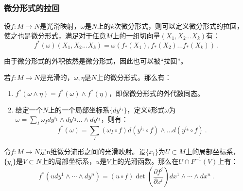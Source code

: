 \subsubsection{微分形式的拉回}
\begin{definition}{}
设$f:M\rightarrow N$是光滑映射，$\omega$是$N$上的$k$次微分形式，则可以定义微分形式的拉回，使之也是微分形式，满足对于任意$M$上的一组切向量$(X_1,X_2...X_k)$有：
\begin{equation}
f^*(\omega)(X_1,X_2...X_k)=\omega(f_*(X_1),f_*(X_2)...f_*(X_k))~.
\end{equation}
\end{definition}
由于微分形式的外积依然是微分形式，因此也可以被“拉回”。
\begin{theorem}{}
若$f:M\rightarrow N$是光滑的，$\omega,\eta$是$N$上的微分形式。那么有：
\begin{enumerate}
\item $f^*(\omega\wedge \eta)=f^*(\omega)\wedge f^*(\eta)$，即保微分形式的外代数同态。
\item 给定一个$N$上的一个局部坐标系$\{dy^{i_1}\}$，定义$k$形式$\omega$为$\omega=\sum_I\omega_I dy^{i_1}\wedge dy^{i_2}...\wedge dy^{i_k}$，则有：
\begin{equation}
f^*(\omega)=\sum_I (\omega_I\circ f)d(y^{i_1}\circ f)\wedge...d(y^{i_k}\circ f)~.
\end{equation}
\end{enumerate}
\end{theorem}
\begin{theorem}{}
令$f:M\rightarrow N$是n维微分流形之间的光滑映射。设$\{x_i\}$为$U\subset M$上的局部坐标系，$\{y_i\}$是$V\subset N$上的局部坐标系，$u$是$V$上的光滑函数。那么在$U\cap F^{-1}(V)$上有：
\begin{equation}
f^*\left(u d y^1 \wedge \cdots \wedge d y^n\right)=(u \circ f) \operatorname{det}\left(\frac{\partial f^j}{\partial x^i}\right) d x^1 \wedge \cdots \wedge d x^n~.
\end{equation}
\end{theorem}